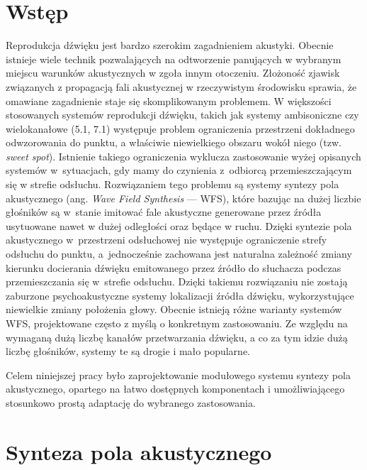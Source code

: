 \documentclass[12pt]{oska}
\affiliation{Akademia Górniczo-Hutnicza im. Stanisława Staszica w Krakowie}
\let\Oldsection\section
\renewcommand{\section}{\FloatBarrier\Oldsection}
\begin{document}
\maketitles

\section{Wstęp}

Reprodukcja dźwięku jest bardzo szerokim zagadnieniem akustyki. Obecnie istnieje wiele technik pozwalających na odtworzenie panujących w
wybranym miejscu warunków akustycznych w zgoła innym otoczeniu. Złożoność
zjawisk związanych z propagacją fali akustycznej w rzeczywistym środowisku
sprawia, że omawiane zagadnienie staje się skomplikowanym problemem.  W większości
stosowanych systemów reprodukcji dźwięku, takich jak systemy ambisoniczne czy
wielokanałowe (5.1, 7.1) występuje problem ograniczenia przestrzeni dokładnego
odwzorowania do punktu, a właściwie niewielkiego obszaru wokół niego (tzw.
\textit{sweet spot}).
Istnienie takiego ograniczenia wyklucza zastosowanie wyżej opisanych systemów w~sytuacjach, gdy mamy do czynienia z~odbiorcą przemieszczającym się w strefie
odsłuchu. Rozwiązaniem tego problemu są systemy syntezy pola akustycznego (ang.
\textit{Wave Field Synthesis} --- WFS), które bazując na dużej liczbie
głośników są w~stanie imitować fale akustyczne generowane przez źródła
usytuowane nawet w dużej odległości oraz będące w ruchu. Dzięki syntezie pola
akustycznego w~przestrzeni odsłuchowej nie występuje ograniczenie strefy
odsłuchu do punktu, a~jednocześnie zachowana jest naturalna zależność zmiany
kierunku docierania dźwięku emitowanego przez źródło do słuchacza podczas
przemieszczania się w~strefie odsłuchu. Dzięki takiemu rozwiązaniu nie zostają
zaburzone psychoakustyczne systemy lokalizacji źródła dźwięku, wykorzystujące
niewielkie zmiany położenia głowy. Obecnie istnieją różne warianty systemów
WFS, projektowane często z myślą o konkretnym zastosowaniu. Ze względu na
wymaganą dużą liczbę kanałów przetwarzania dźwięku, a co za tym idzie dużą
liczbę głośników, systemy te są drogie i mało popularne.

Celem niniejszej pracy było zaprojektowanie modułowego systemu syntezy pola
akustycznego, opartego na łatwo dostępnych komponentach i umożliwiającego
stosunkowo prostą adaptację do wybranego zastosowania.

\section{Synteza pola akustycznego}
\end{document}
